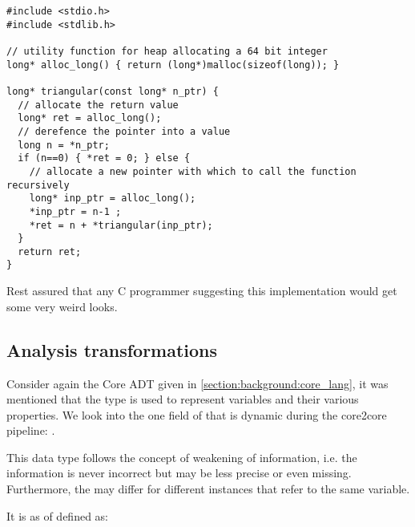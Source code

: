 \begin{verbatim}
#include <stdio.h>
#include <stdlib.h>

// utility function for heap allocating a 64 bit integer
long* alloc_long() { return (long*)malloc(sizeof(long)); }

long* triangular(const long* n_ptr) {
  // allocate the return value
  long* ret = alloc_long();
  // derefence the pointer into a value
  long n = *n_ptr;
  if (n==0) { *ret = 0; } else {
    // allocate a new pointer with which to call the function recursively
    long* inp_ptr = alloc_long();
    *inp_ptr = n-1 ;
    *ret = n + *triangular(inp_ptr);
  }
  return ret;
}
\end{verbatim}

Rest assured that any C programmer suggesting this implementation would get some very weird looks.

\subsection{Analysis transformations}

Consider again the Core ADT given in \cref{section:background:core_lang}, it was mentioned that the 
type is used to represent variables and their various properties. We look into the one field of  that
is dynamic during the core2core pipeline: .

This data type follows the concept of weakening of information, i.e. the information is never incorrect but
may be less precise or even missing. Furthermore, the  may differ for different  instances
that refer to the same variable.

It is as of  defined as:

